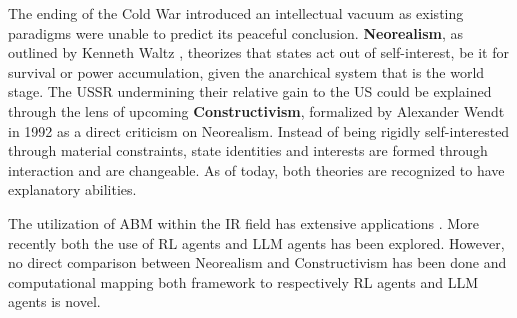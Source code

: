 %
%
%

The ending of the Cold War introduced an intellectual vacuum as existing paradigms were unable to predict its peaceful conclusion. \textbf{Neorealism}, as outlined by Kenneth Waltz \cite{waltz1979}, theorizes that states act out of self-interest, be it for survival or power accumulation, given the anarchical system that is the world stage. The USSR undermining their relative gain to the US could be explained through the lens of upcoming \textbf{Constructivism}, formalized by Alexander Wendt \cite{wendt1992} in 1992 as a direct criticism on Neorealism. Instead of being rigidly self-interested through material constraints, state identities and interests are formed through interaction and are changeable. As of today, both theories are recognized to have explanatory abilities.

The utilization of ABM within the IR field has extensive applications \cite{cederman1997}. More recently both the use of RL agents \cite{pan2025} and LLM agents \cite{hua2023waragent} has been explored. However, no direct comparison between Neorealism and Constructivism has been done and computational mapping both framework to respectively RL agents and LLM agents is novel.

